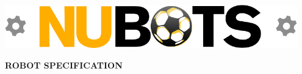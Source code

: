 \documentclass[10pt,a4paper]{article}
\begin{document}
\begin{center}
	\includegraphics[width=0.95\textwidth]{nubots_logo.png}
\end{center}
\vspace{5em}

\begin{center}
	\colorbox[rgb]{0.0, 0.0, 0.0}
	{
	\begin{minipage}[c][3em][c]{0.97\textwidth}
		{\color{textcolour}
			{
			\begin{Large}
				\textbf{ROBOT SPECIFICATION}
			\end{Large}
			}
		}
	\end{minipage}
	}
\end{center}
\end{document}
